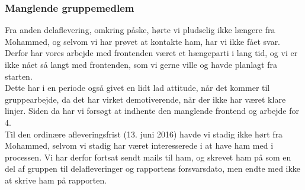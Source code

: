 \documentclass[]{article}
\begin{document}
\subsubsection{Manglende gruppemedlem}
\noindent Fra anden delaflevering, omkring påske, hørte vi pludselig ikke længere fra Mohammed, og selvom vi har prøvet at kontakte ham, har vi ikke fået svar. Derfor har vores arbejde med frontenden været et hængeparti i lang tid, og vi er ikke nået så langt med frontenden, som vi gerne ville og havde planlagt fra starten.\\
Dette har i en periode også givet en lidt lad attitude, når det kommer til gruppearbejde, da det har virket demotiverende, når der ikke har været klare linjer. Siden da har vi forsøgt at indhente den manglende frontend og arbejde for 4. \\
Til den ordinære afleveringsfrist (13. juni 2016) havde vi stadig ikke hørt fra Mohammed, selvom vi stadig har været interesserede i at have ham med i processen. Vi har derfor fortsat sendt mails til ham, og skrevet ham på som en del af gruppen til delafleveringer og rapportens forsvarsdato, men endte med ikke at skrive ham på rapporten.
\end{document}
